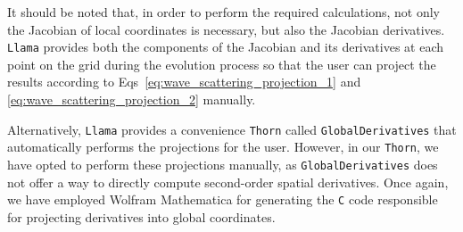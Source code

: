 It should be noted that, in order to perform the required calculations, not only the Jacobian of local coordinates is necessary, but also the Jacobian derivatives. \texttt{Llama} provides both the components of the Jacobian and its derivatives at each point on the grid during the evolution process so that the user can project the results according to Eqs~\eqref{eq:wave_scattering_projection_1} and \eqref{eq:wave_scattering_projection_2} manually.

Alternatively, \texttt{Llama} provides a convenience \texttt{Thorn} called \texttt{GlobalDerivatives} that automatically performs the projections for the user. However, in our \texttt{Thorn}, we have opted to perform these projections manually, as \texttt{GlobalDerivatives} does not offer a way to directly compute second-order spatial derivatives. Once again, we have employed Wolfram Mathematica for generating the \texttt{C} code responsible for projecting derivatives into global coordinates.